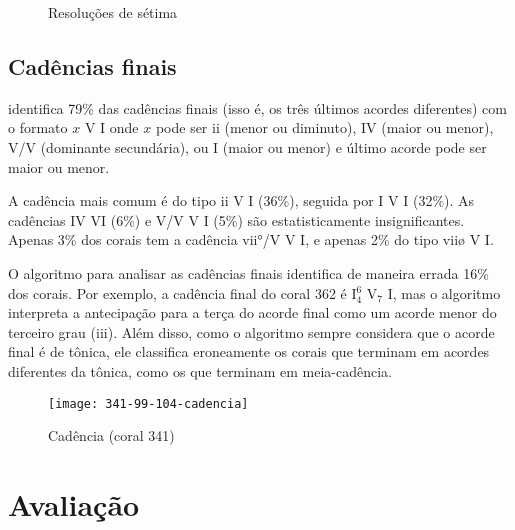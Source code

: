 \begin{figure}
  \centering
  \caption{Resoluções de sétima}
  \label{fig:setima-resol}
\end{figure}

\subsection{Cadências finais}
\label{sec:cadencias}

\rameau{} identifica 79\% das cadências finais (isso é, os três
últimos acordes diferentes) com o formato $x$ V I onde $x$ pode ser ii
(menor ou diminuto), IV (maior ou menor), V/V (dominante secundária),
ou I (maior ou menor) e último acorde pode ser maior ou menor.

A cadência mais comum é do tipo ii V I (36\%), seguida por I V I
(32\%). As cadências IV VI (6\%) e V/V V I (5\%) são estatisticamente
insignificantes. Apenas 3\% dos corais tem a cadência vii°/V V I, e
apenas 2\% do tipo viiø V I. 

O algoritmo para analisar as cadências finais identifica de maneira
errada 16\% dos corais. Por exemplo, a cadência final do coral 362 é
I$^6_4$ V$_7$ I, mas o algoritmo interpreta a antecipação para a terça
do acorde final como um acorde menor do terceiro grau (iii). Além
disso, como o algoritmo sempre considera que o acorde final é de
tônica, ele classifica eroneamente os corais que terminam em acordes
diferentes da tônica, como os que terminam em meia-cadência.

\begin{figure}
  \centering
  \texttt{[image: 341-99-104-cadencia]}
  \caption{Cadência (coral 341)}
  \label{fig:cadencia}
\end{figure}

\section{Avaliação}
\label{sec:avaliacao}

